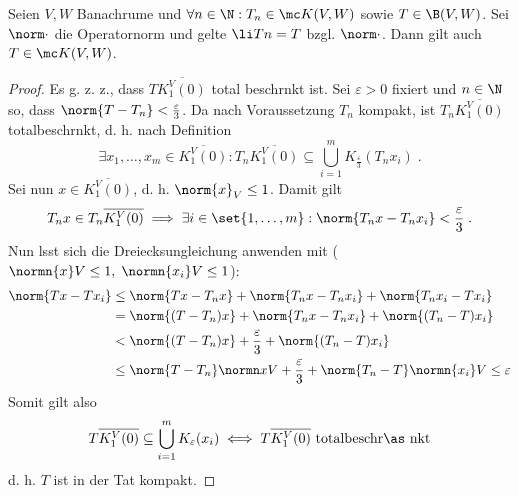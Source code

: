 \begin{theorem}
	Seien \(V,W\) Banachr\as ume und \(\forall n \in \N: T_n \in \mc K(V,W)\) sowie \(T\in \B(V,W)\). Sei \(\norm\cdot\) die Operatornorm und gelte \(\li Tn = T\) bzgl. \(\norm\cdot\). Dann gilt auch \(T\in \mc K(V,W)\).
	\label{limit_compact_op_is_compact}
\end{theorem}

\begin{proof}
	Es g. z. z., dass \(T\overline{K_1^V(0)}\) total beschr\as nkt ist. Sei \(\varepsilon > 0\) fixiert und \(n \in \N\) so, dass \(\norm{T-T_n}<\frac{\varepsilon}{3}\). Da nach Voraussetzung $T_n$ kompakt, ist \(T_n \overline{K_1^V(0)}\) totalbeschr\as nkt, d. h. nach Definition
	\[\exists x_1,\ldots,x_m \in \overline{K_1^V(0)}: T_n \overline{K_1^V(0)} \subseteq \bigcup_{i=1}^m K_{\frac\varepsilon3}(T_n x_i)\;.\]
	Sei nun \(x\in \overline{K_1^V(0)}\), d. h. \(\norm{x}_V \leq 1\). Damit gilt
	\[T_n x \in T_n\overline{K_1^V(0)} \implies \exists i\in \set{1,\ldots,m}: \norm{T_n x - T_n x_i} < \frac{\varepsilon}{3}\;.\]
	Nun l\as sst sich die Dreiecksungleichung anwenden mit (\(\normn{x}V \leq 1, \;\normn{x_i}V \leq 1\)):
	\begin{align*}
		\norm{Tx - Tx_i} &\leq \norm{Tx - T_n x} + \norm{T_n x - T_n x_i} + \norm{T_n x_i - T x_i}\\
		&  = \norm{(T-T_n)x }+ \norm{T_n x - T_n x_i}  + \norm{(T_n -T)x_i}\\
		& < \norm{(T-T_n)x }+ \frac\varepsilon 3 + \norm{(T_n -T)x_i}\\
		&\leq \norm{T-T_n}\normn xV + \frac\varepsilon 3 +\norm{T_n - T} \normn{x_i}V \leq \varepsilon
	\end{align*}
	Somit gilt also 
	\[T\overline{K_1^V(0)} \subseteq \bigcup_{i=1}^m K_\varepsilon (x_i) \iff T\overline{K_1^V(0)} \text{ totalbeschr\as nkt}\]
	d. h. $T$ ist in der Tat kompakt. 
\end{proof}